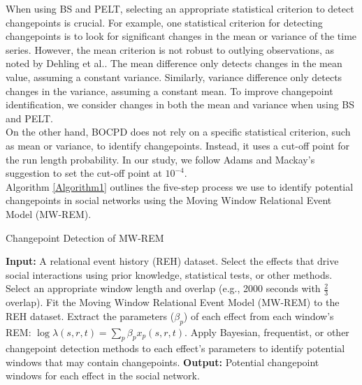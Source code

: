 \documentclass[]{interact}
\theoremstyle{plain}%
\theoremstyle{definition}
\theoremstyle{remark}
\begin{document}
	When using BS and PELT, selecting an appropriate statistical criterion to detect changepoints is crucial. For example, one statistical criterion for detecting changepoints is to look for significant changes in the mean or variance of the time series. However, the mean criterion is not robust to outlying observations, as noted by Dehling et al.\cite{dehlingRobustMethodShift2020}. The mean difference only detects changes in the mean value, assuming a constant variance. Similarly, variance difference only detects changes in the variance, assuming a constant mean. To improve changepoint identification, we consider changes in both the mean and variance when using BS and PELT. \\
	
	On the other hand, BOCPD does not rely on a specific statistical criterion, such as mean or variance, to identify changepoints. Instead, it uses a cut-off point for the run length probability. In our study, we follow Adams and Mackay's suggestion to set the cut-off point at $10^{-4}$\cite{adamsBayesianOnlineChangepoint2007}. \\
	
	Algorithm \ref{Algorithm1} outlines the five-step process we use to identify potential changepoints in social networks using the Moving Window Relational Event Model (MW-REM).
	
	\begin{scriptsize}
	\begin{algorithm}[H]
		\caption{Changepoint Detection of MW-REM}\label{Algorithm1}
		\small %
		\begin{algorithmic}[1]
			\Statex \textbf{Input:} A relational event history (REH) dataset.
			\State Select the effects that drive social interactions using prior knowledge, statistical tests, or other methods.
			\State Select an appropriate window length and overlap (e.g., 2000 seconds with $\frac{2}{3}$ overlap).
			\State Fit the Moving Window Relational Event Model (MW-REM) to the REH dataset.
			\State Extract the parameters ($\beta_p$) of each effect from each window's REM: $\log \lambda(s,r,t) = \sum_{p} \beta_p x_p(s,r,t)$.
			\State Apply Bayesian, frequentist, or other changepoint detection methods to each effect's parameters to identify potential windows that may contain changepoints.
			\Statex \textbf{Output:} Potential changepoint windows for each effect in the social network.
		\end{algorithmic}
	\end{algorithm}
    \end{scriptsize}
\end{document}
